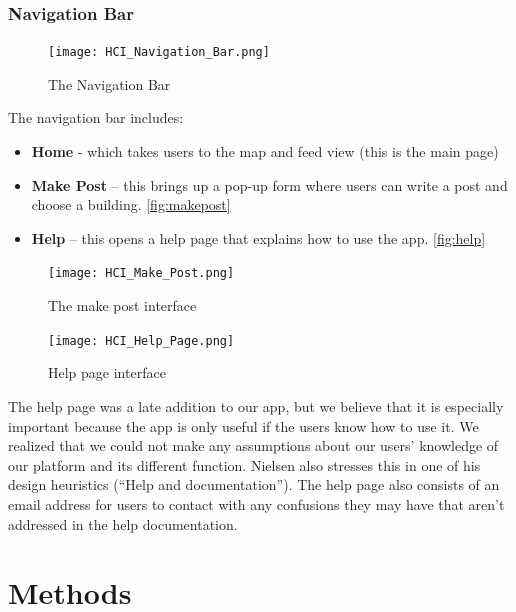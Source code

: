 \documentclass{article}
\begin{document}
\subsubsection{Navigation Bar}

\begin{figure}[htbp]
    \centering
    \texttt{[image: HCI\_Navigation\_Bar.png]}
    \caption{The Navigation Bar}
    \label{fig:navbar}
\end{figure}

The navigation bar includes: 

\begin{itemize}
    \item \textbf{Home} - which takes users to the map and feed view (this is the main page)
    \item \textbf{Make Post} – this brings up a pop-up form where users can write a post and choose a building. \autoref{fig:makepost}
    \item \textbf{Help} – this opens a help page that explains how to use the app. \autoref{fig:help}
\end{itemize}

\begin{figure}[htbp]

\centering
\begin{minipage}[h]{0.49\linewidth}    
    \centering
    \texttt{[image: HCI\_Make\_Post.png]}
    \caption{The make post interface}
    \label{fig:makepost}
\end{minipage}
\hfill
\begin{minipage}[h]{0.49\linewidth}
    \centering
    \texttt{[image: HCI\_Help\_Page.png]}
    \caption{Help page interface}
    \label{fig:help}
\end{minipage}
\end{figure}


The help page was a late addition to our app, but we believe that it is especially important because the app is only useful if the users know how to use it. We realized that we could not make any assumptions about our users’ knowledge of our platform and its different function. Nielsen also stresses this in one of his design heuristics (“Help and documentation”). The help page also consists of an email address for users to contact with any confusions they may have that aren’t addressed in the help documentation.

\newpage

\section{Methods}
\end{document}
